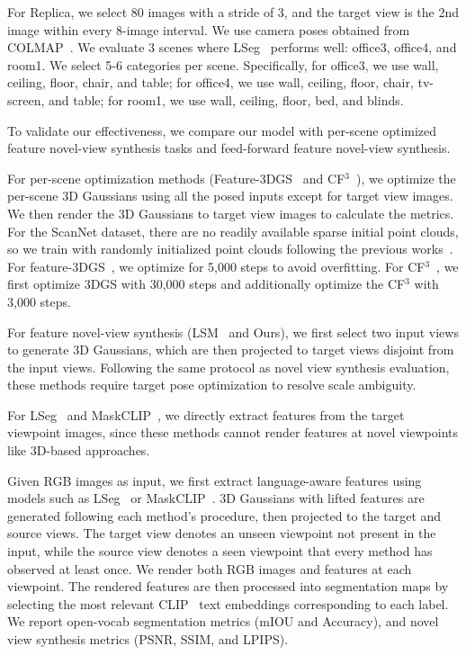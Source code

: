 For Replica, we select 80 images with a stride of 3, and the target view is the 2nd image within every 8-image interval. We use camera poses obtained from COLMAP~\cite{schonberger2016structure}. We evaluate 3 scenes where LSeg~\cite{li2022language} performs well: office3, office4, and room1. We select 5-6 categories per scene. Specifically, for office3, we use wall, ceiling, floor, chair, and table; for office4, we use wall, ceiling, floor, chair, tv-screen, and table; for room1, we use wall, ceiling, floor, bed, and blinds.

To validate our effectiveness, we compare our model with per-scene optimized feature novel-view synthesis tasks and feed-forward feature novel-view synthesis.

For per-scene optimization methods (Feature-3DGS~\cite{zhou2024feature} and CF$^3$~\cite{lee2025cf3}), we optimize the per-scene 3D Gaussians using all the posed inputs except for target view images. We then render the 3D Gaussians to target view images to calculate the metrics. For the ScanNet dataset, there are no readily available sparse initial point clouds, so we train with randomly initialized point clouds following the previous works~\cite{qin2024langsplat, li2025langsplatv2}. For feature-3DGS~\cite{zhou2024feature}, we optimize for 5,000 steps to avoid overfitting. For CF$^3$~\cite{lee2025cf3}, we first optimize 3DGS with 30,000 steps and additionally optimize the CF$^3$ with 3,000 steps. 

For feature novel-view synthesis (LSM~\cite{fan2024large} and Ours), we first select two input views to generate 3D Gaussians, which are then projected to target views disjoint from the input views. Following the same protocol as novel view synthesis evaluation, these methods require target pose optimization to resolve scale ambiguity. 

For LSeg~\cite{li2022language} and MaskCLIP~\cite{zhou2022extract}, we directly extract features from the target viewpoint images, since these methods cannot render features at novel viewpoints like 3D-based approaches. 


Given RGB images as input, we first extract language-aware features using models such as LSeg~\cite{li2022language} or MaskCLIP~\cite{zhou2022extract}. 3D Gaussians with lifted features are generated following each method's procedure, then projected to the target and source views. The target view denotes an unseen viewpoint not present in the input, while the source view denotes a seen viewpoint that every method has observed at least once. We render both RGB images and features at each viewpoint. The rendered features are then processed into segmentation maps by selecting the most relevant CLIP~\cite{radford2021learning} text embeddings corresponding to each label. We report open-vocab segmentation metrics (mIOU and Accuracy), and novel view synthesis metrics (PSNR, SSIM, and LPIPS).


